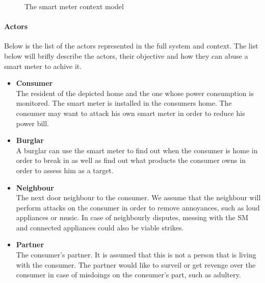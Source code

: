 \begin{figure}[h]
  \centering
  
  \caption{The smart meter context model}
  \label{contextual:sm_model}
\end{figure}

\paragraph{Actors}\label{contextActors}
Below is the list of the actors represented in the full system and context.
The list below will brifly describe the actors, their objective and how they can abuse a smart meter to achive it.
\begin{itemize}
\item \textbf{Consumer}\\
The resident of the depicted home and the one whose power consumption is monitored.
The smart meter is installed in the consumers home.
The consumer may want to attack his own smart meter in order to reduce his power bill.
\item \textbf{Burglar}\\ A burglar can use the smart meter to find out when the consumer is home in order to break in as well as find out what products the consumer owns in order to assess him as a target.
\item \textbf{Neighbour}\\
The next door neighbour to the consumer.
We assume that the neighbour will perform attacks on the consumer in order to remove annoyances, such as loud appliances or music.
In case of neighbourly disputes, messing with the SM and connected appliances could also be viable strikes.
\item \textbf{Partner}\\
The consumer's partner.
It is assumed that this is not a person that is living with the consumer. 
The partner would like to surveil or get revenge over the consumer in case of misdoings on the consumer's part, such as adultery.


\end{itemize}
